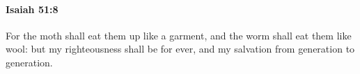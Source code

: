 
		\paragraph{Isaiah 51:8} %
			\label{ISAIAH-51-8}

			For the moth shall eat them up like a garment, and the worm shall eat them like wool: but my righteousness shall be for ever, and my salvation from generation to generation.


